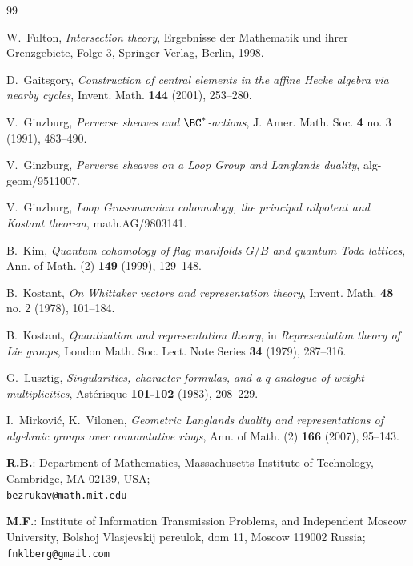 \documentclass[11pt]{amsart}
\theoremstyle{definition}
\theoremstyle{remark}
\theoremstyle{remark}
\newcommand{\<}{\langle}
\renewcommand{\>}{\rangle}
\begin{document}
\begin{thebibliography}{99}

 W.~Fulton, {\em Intersection theory}, 
Ergebnisse der Mathematik und ihrer Grenzgebiete, Folge 3,
Springer-Verlag, Berlin, 1998. 

 D.~Gaitsgory, {\em Construction of central elements in
  the affine Hecke algebra via nearby cycles}, Invent. Math. {\bf 144}
  (2001), 253--280.

 V.~Ginzburg, {\em Perverse sheaves and $\BC^*$-actions},
J. Amer. Math. Soc. {\bf 4} no. 3 (1991), 483--490.

 V.~Ginzburg, {\em Perverse sheaves on a Loop Group and
Langlands duality}, alg-geom/9511007.

 V.~Ginzburg, {\em Loop Grassmannian cohomology, the principal
nilpotent and Kostant theorem}, math.AG/9803141.

 B.~Kim, {\em Quantum cohomology of flag manifolds $G/B$
and quantum Toda lattices}, Ann. of Math. (2) {\bf 149} (1999), 129--148.

 B.~Kostant, {\em On Whittaker vectors and representation
  theory}, Invent. Math. {\bf 48} no. 2 (1978), 101--184.

 B.~Kostant, {\em Quantization and representation theory},
in {\em Representation theory of Lie groups}, London
Math. Soc. Lect. Note Series {\bf 34} (1979), 287--316.

 G.~Lusztig, {\em Singularities, character formulas, and
a $q$-analogue of weight multiplicities}, Ast{\'e}risque {\bf 101-102}
(1983), 208--229.

 I.~Mirkovi\'c, K.~Vilonen, {\em Geometric Langlands duality
and representations of algebraic groups over commutative rings}, 
Ann. of Math. (2) {\bf 166} (2007), 95--143.

\end{thebibliography}



\footnotesize{
{\bf R.B.}: Department of Mathematics,
Massachusetts Institute of Technology,
Cambridge, MA 02139, USA;\\ 
{\tt bezrukav@math.mit.edu}}

\footnotesize{
{\bf M.F.}: Institute of Information Transmission Problems, and 
Independent Moscow University,
Bolshoj Vlasjevskij pereulok, dom 11,
Moscow 119002 Russia;\\
{\tt fnklberg@gmail.com}}
\end{document}

